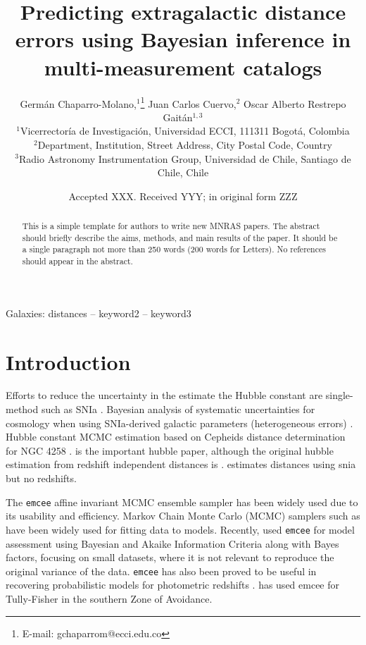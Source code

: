 \documentclass[a4paper,fleqn,usenatbib]{mnras}
\title[Predicting extragalactic distance errors]{Predicting extragalactic distance errors using Bayesian inference in multi-measurement catalogs}
\author[G. Chaparro-Molano et al.]{
Germ\'an Chaparro-Molano,$^{1}$\thanks{E-mail: gchaparrom@ecci.edu.co}
Juan Carlos Cuervo,$^{2}$
Oscar Alberto Restrepo Gait\'an$^{1,3}$
\\
$^{1}$Vicerrector\'ia de Investigaci\'on, Universidad ECCI, 111311 Bogot\'a, Colombia\\
$^{2}$Department, Institution, Street Address, City Postal Code, Country\\
$^{3}$Radio Astronomy Instrumentation Group, Universidad de Chile, Santiago de Chile, Chile
}
\date{Accepted XXX. Received YYY; in original form ZZZ}
\begin{document}
\label{firstpage}
\pagerange{\pageref{firstpage}--\pageref{lastpage}}
\maketitle

\begin{abstract}
This is a simple template for authors to write new MNRAS papers.
The abstract should briefly describe the aims, methods, and main results of the paper.
It should be a single paragraph not more than 250 words (200 words for Letters).
No references should appear in the abstract.
\end{abstract}

\begin{keywords}
Galaxies: distances -- keyword2 -- keyword3
\end{keywords}



\section{Introduction}

Efforts to reduce the uncertainty in the estimate the Hubble constant are single-method such as SNIa \citet{hubsn2018}. Bayesian analysis of systematic uncertainties for cosmology when using SNIa-derived galactic parameters (heterogeneous errors) \citet{unity}. Hubble constant MCMC estimation based on Cepheids distance determination for NGC 4258 \citet{hubngc}. \citet{hub2010} is the important hubble paper, although the original hubble estimation from redshift independent distances is \citet{huborig}. \citet{ridsn} estimates distances using snia but no redshifts. 

The \texttt{emcee} affine invariant MCMC ensemble sampler \citet{emcee} has been widely used due to its usability and efficiency. Markov Chain Monte Carlo (MCMC) samplers such as \citet{emcee} have been widely used for fitting data to models. Recently, \citet{propprob2018} used \texttt{emcee} for model assessment using Bayesian and Akaike Information Criteria along with Bayes factors, focusing on small datasets, where it is not relevant to reproduce the original variance of the data. \texttt{emcee} has also been proved to be useful in recovering probabilistic models for photometric redshifts \citet{photred1,photred2} . \citet{said} has used emcee for Tully-Fisher in the southern Zone of Avoidance.
\end{document}
